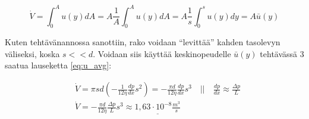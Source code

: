 \documentclass[12pt,a4paper,finnish]{article}
\begin{document}
\begin{equation}
 \dot{V} = \int_0^A u(y) dA = A\frac{1}{A}\int_0^Au(y)dA = A\frac{1}{s}\int_0^su(y)dy = A\bar{u}(y)
\end{equation}

Kuten tehtävänannossa sanottiin, rako voidaan ``levittää'' kahden tasolevyn väliseksi, koska $s << d$. 
Voidaan siis käyttää keskinopeudelle $\bar{u}(y)$ tehtävässä 3 saatua lauseketta \ref{eq:u_avg}:

\begin{align}
 &\dot{V} = \pi sd\left(-\frac{1}{12\eta}\frac{dp}{dx}s^2\right) = -\frac{\pi d}{12\eta}\frac{dp}{dx}s^3
   \quad \bigg|\bigg| \quad \frac{dp}{dx} \approx \frac{\Delta p}{L}\\
 &\dot{V} = -\frac{\pi d}{12\eta}\frac{\Delta p}{L}s^3 \approx \underline{1,63\cdot 10^{-8}\frac{m^3}{s}}
\end{align}
\end{document}
